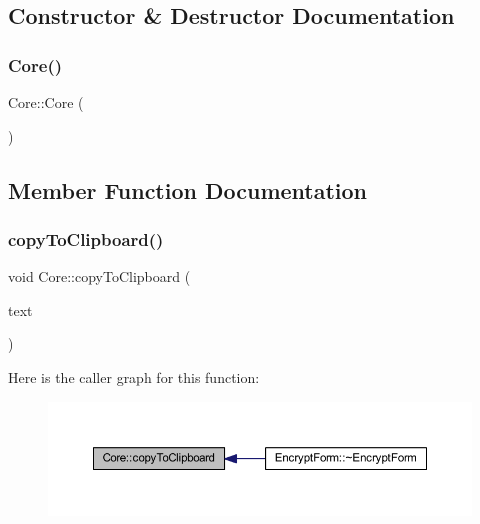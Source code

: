 \subsection{Constructor \& Destructor Documentation}
\hypertarget{class_core_a14e63188e0aa7c4a6f72d5501384d1f9}{}\label{class_core_a14e63188e0aa7c4a6f72d5501384d1f9} 
\subsubsection{\texorpdfstring{Core()}{Core()}}
{\footnotesize\ttfamily Core\+::\+Core (\begin{DoxyParamCaption}{ }\end{DoxyParamCaption})}



\subsection{Member Function Documentation}
\hypertarget{class_core_a3f943c730fb3d550dd4d7f82667beebb}{}\label{class_core_a3f943c730fb3d550dd4d7f82667beebb} 
\subsubsection{\texorpdfstring{copy\+To\+Clipboard()}{copyToClipboard()}}
{\footnotesize\ttfamily void Core\+::copy\+To\+Clipboard (\begin{DoxyParamCaption}\item[{Q\+String}]{text }\end{DoxyParamCaption})}

Here is the caller graph for this function\+:
\nopagebreak
\begin{figure}[H]
\begin{center}
\leavevmode
\includegraphics[width=350pt]{class_core_a3f943c730fb3d550dd4d7f82667beebb_icgraph}
\end{center}
\end{figure}
\hypertarget{class_core_aa75cf5dbf2f48a261a8596c42cf99946}{}\label{class_core_aa75cf5dbf2f48a261a8596c42cf99946} 
